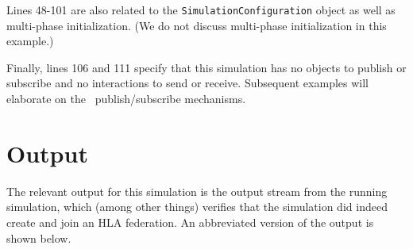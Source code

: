 Lines 48-101 are also related to the {\tt SimulationConfiguration} object
as well as multi-phase initialization.
(We do not discuss multi-phase initialization in this example.)

Finally, lines 106 and 111 specify that this simulation has no objects
to publish or subscribe and no interactions to send or receive.
Subsequent examples will elaborate on the \TrickHLA\ publish/subscribe
mechanisms.

\section{Output}

The relevant output for this simulation is the output stream from the
running simulation, which (among other things) verifies that the simulation
did indeed create and join an HLA federation.
An abbreviated version of the output is shown below.

